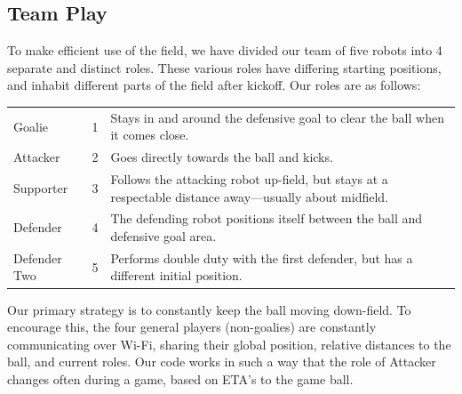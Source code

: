\documentclass{article}
\begin{document}
  \subsection{Team Play}
		To make efficient use of the field, we have divided our team of five robots into 4 separate and distinct roles. These various roles have differing starting positions, and inhabit different parts of the field after kickoff. Our roles are as follows:

		\begin{center}
			\begin{tabular}{ l c p{7cm} } %
				Goalie & 1 & Stays in and around the defensive goal to clear the ball when it comes close. \\
				Attacker & 2 & Goes directly towards the ball and kicks. \\
				Supporter & 3 & Follows the attacking robot up-field, but stays at a respectable distance away---usually about midfield. \\
				Defender & 4 & The defending robot positions itself between the ball and defensive goal area. \\
				Defender Two & 5 & Performs double duty with the first defender, but has a different initial position. \\
			\end{tabular}
		\end{center}

		Our primary strategy is to constantly keep the ball moving down-field. To encourage this, the four general players (non-goalies) are constantly communicating over Wi-Fi, sharing their global position, relative distances to the ball, and current roles. Our code works in such a way that the role of Attacker changes often during a game, based on ETA's to the game ball. 
\end{document}
